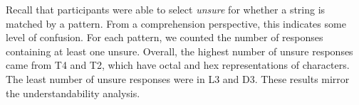 
Recall that participants were able to select \emph{unsure} for whether a string is matched  by a pattern. 
From a comprehension perspective, this indicates some level of confusion. 
For each pattern, we counted the number of responses containing at least one unsure.
Overall, the highest number of unsure responses came from T4 and T2, which have octal and hex representations of characters. The least number of unsure responses were in L3 and D3.
These results mirror the understandability analysis.%



